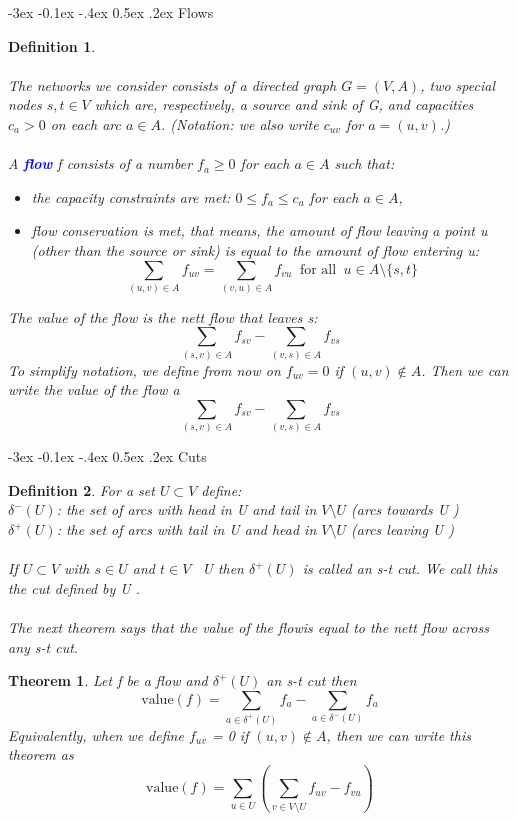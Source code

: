 \documentclass[10pt]{report}
\makeatletter
\numberwithin{dummy}{section}
\theoremstyle{ocrenumbox}
\newtheorem{definitionTTT}{Theorem}[]
\theoremstyle{grayman}
\newtheorem{definitionTTTT}{Definition}[]
\newenvironment{thm}{\begin{tBox}\begin{definitionTTT}}{\end{definitionTTT}\end{tBox}}
\newenvironment{voc}{\begin{vBox}\begin{definitionTTTT}}{\end{definitionTTTT}\end{vBox}}
\renewcommand{\subsection}{\@startsection {subsection}{2}{\z@}
{-3ex \@plus -0.1ex \@minus -.4ex}
{0.5ex \@plus.2ex }
{\normalfont\sffamily\bfseries}}
\makeatother
\begin{document}
\subsection{Flows}
\begin{voc} \phantom{a}\\ \\
    The networks we consider consists of a directed graph $G = (V, A)$, two special nodes $s, t \in V$ which are, respectively, a source and sink of G, and capacities $c_a >0$ on each arc $a \in A$. (Notation: we also write $c_{uv}$ for $a = (u, v)$.)\\ \\
A \textbf{\textcolor{blue}{flow}} f consists of a number $f_a \ge 0$ for each $a \in A$ such that:
\begin{itemize}
    \item the capacity constraints are met: $0 \leq f_a \leq c_a$ for each $a \in A$,
    \item flow conservation is met, that means, the amount of flow leaving a point u (other than the source or sink) is equal to the amount of flow entering u:
    \[\sum_{(u,v)\in A} f_{uv} = \sum_{(v,u)\in A} f_{vu}\phantom{a} \mbox{for all}\phantom{a} u\in A\setminus \{ s,t \}\]
\end{itemize}
The value of the flow is the nett flow that leaves s:
\[\sum_{(s,v)\in A} f_{sv} - \sum_{(v,s)\in A} f_{vs}\]
To simplify notation, we define from now on $f_{uv} = 0$ if $(u, v) \notin A$. Then we can write the value of the flow a
\[\sum_{(s,v)\in A} f_{sv} - \sum_{(v,s)\in A} f_{vs}\]
\end{voc}
\subsection{Cuts}
\begin{voc}

For a set $U \subset V $ define:\\
$\delta^-(U)$: the set of arcs with head in U and tail in $V\setminus U$ (arcs towards U )\\
$\delta^+(U)$: the set of arcs with tail in U and head in $V\setminus U$ (arcs leaving U )\\ \\
If $U \subset V $ with $s \in U$ and $t \in V$ \ U then $\delta^+(U)$ is called an s-t cut. We call
this the cut defined by U .\\ \\The next theorem says that the value of the flowis equal to the nett flow across any s-t cut.
\end{voc}
\begin{thm}
    Let f be a flow and $\delta^+(U)$ an s-t cut then
    \[\mbox{value}(f) = \sum_{a \in \delta^+(U)} f_a - \sum_{a \in \delta^-(U)} f_a\]
    Equivalently, when we define $f_{uv}$ = 0 if $(u, v) \notin A$, then we can write this theorem as
    \[\mbox{value}(f) = \sum_{u \in U}  \left( \sum_{v \in V\setminus U} f_{uv} - f_{vu}\right)\]
\end{thm}
\end{document}

